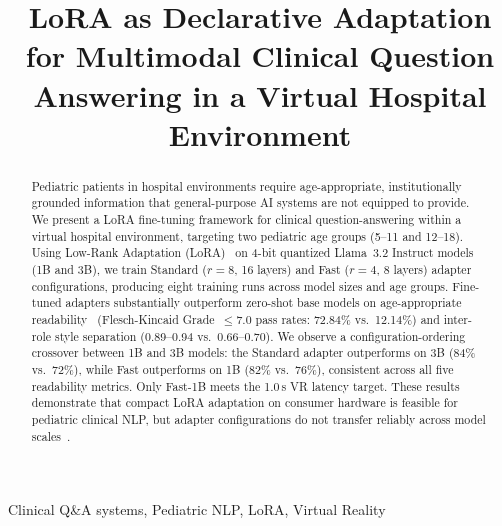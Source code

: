 \documentclass[conference]{IEEEtran}
\begin{document}
\title{LoRA as Declarative Adaptation for Multimodal Clinical Question Answering in a Virtual Hospital Environment}

\author{
}

\maketitle

\begin{abstract}
Pediatric patients in hospital environments require age-appropriate, institutionally grounded information that general-purpose AI systems are not equipped to provide. We present a LoRA fine-tuning framework for clinical question-answering within a virtual hospital environment, targeting two pediatric age groups (5--11 and 12--18). Using Low-Rank Adaptation (LoRA)~\cite{hu2022lora} on 4-bit quantized Llama~3.2 Instruct models (1B and 3B), we train Standard ($r{=}8$, 16 layers) and Fast ($r{=}4$, 8 layers) adapter configurations, producing eight training runs across model sizes and age groups. Fine-tuned adapters substantially outperform zero-shot base models on age-appropriate readability~\cite{flesch1948,gunning1952,senter1967,mclaughlin1969,kincaid1974,kincaid1975,coleman1975} (Flesch-Kincaid Grade~$\leq$7.0 pass rates: 72.84\% vs.\ 12.14\%) and inter-role style separation (0.89--0.94 vs.\ 0.66--0.70). We observe a configuration-ordering crossover between 1B and 3B models: the Standard adapter outperforms on 3B (84\% vs.\ 72\%), while Fast outperforms on 1B (82\% vs.\ 76\%), consistent across all five readability metrics. Only Fast-1B meets the 1.0\,s VR latency target. These results demonstrate that compact LoRA adaptation on consumer hardware is feasible for pediatric clinical NLP, but adapter configurations do not transfer reliably across model scales~\cite{biderman2024}.
\end{abstract}

\begin{IEEEkeywords}
Clinical Q\&A systems, Pediatric NLP, LoRA, Virtual Reality
\end{IEEEkeywords}
\end{document}
